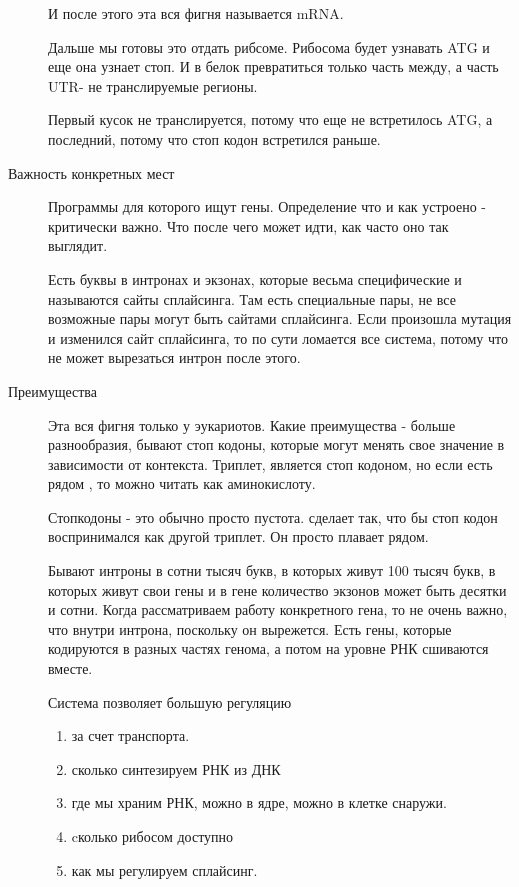 \begin{description}
И после этого эта вся фигня называется mRNA. 

Дальше мы готовы это отдать рибсоме. Рибосома будет 
узнавать ATG и еще она узнает стоп. И в белок превратиться только 
часть между, а часть UTR- не транслируемые регионы. 

Первый кусок не транслируется, потому что еще не встретилось ATG, 
а последний, потому что стоп кодон встретился раньше. 

\item[Важность конкретных мест]
Программы для которого ищут гены. Определение что и как 
устроено - критически важно. Что после чего может идти, 
как часто оно так выглядит. 

Есть буквы в интронах и экзонах, которые весьма специфические и 
называются сайты сплайсинга. Там есть специальные пары, не все возможные 
пары могут быть сайтами сплайсинга. Если произошла мутация и изменился 
сайт сплайсинга, то по сути ломается все система, потому что 
не может вырезаться интрон после этого. 

\item[Преимущества]
Эта вся фигня только у эукариотов. 
Какие преимущества - больше разнообразия, 
бывают стоп кодоны, которые могут менять свое значение в зависимости от контекста. 
Триплет, является стоп кодоном, но если есть 
рядом 
\TODO %
, то можно читать как аминокислоту. 

Стопкодоны - это обычно просто пустота. 
\TODO %
сделает так, что бы
стоп кодон воспринимался как другой триплет. Он просто плавает рядом. 

Бывают интроны в сотни тысяч букв, в которых живут 100 тысяч букв, в которых 
живут свои гены и в гене количество экзонов может быть десятки и сотни. Когда рассматриваем 
работу конкретного гена, то не очень важно, что внутри интрона, 
поскольку он вырежется. Есть гены, которые кодируются в разных частях 
генома, а потом на уровне РНК сшиваются вместе. 

Система позволяет большую регуляцию
\begin{enumerate}
\item за счет транспорта. 
\item сколько синтезируем РНК из ДНК
\item где мы храним РНК, можно в ядре, можно 
в клетке снаружи. 
\item cколько рибосом доступно 
\item как мы регулируем сплайсинг. 
\end{enumerate}


\end{description}
